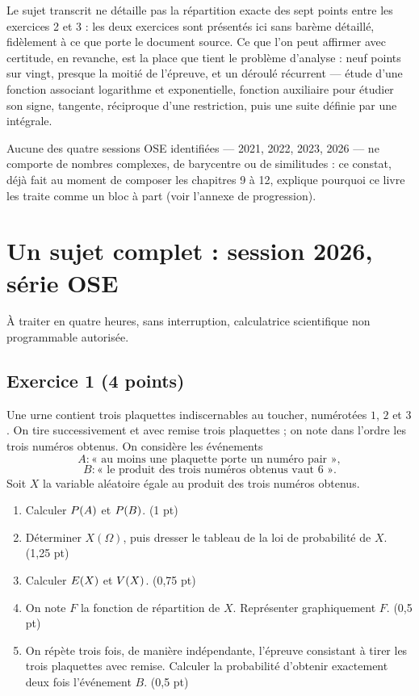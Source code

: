 \noindent
Le sujet transcrit ne détaille pas la répartition exacte des sept points
entre les exercices 2 et 3 : les deux exercices sont présentés ici sans
barème détaillé, fidèlement à ce que porte le document source. Ce que l'on
peut affirmer avec certitude, en revanche, est la place que tient le
problème d'analyse : neuf points sur vingt, presque la moitié de l'épreuve,
et un déroulé récurrent — étude d'une fonction associant logarithme et
exponentielle, fonction auxiliaire pour étudier son signe, tangente,
réciproque d'une restriction, puis une suite définie par une intégrale.

Aucune des quatre sessions OSE identifiées — 2021, 2022, 2023, 2026 — ne
comporte de nombres complexes, de barycentre ou de similitudes : ce constat,
déjà fait au moment de composer les chapitres 9 à 12, explique pourquoi ce
livre les traite comme un bloc à part (voir l'annexe de progression).

\section*{Un sujet complet : session 2026, série OSE}

À traiter en quatre heures, sans interruption, calculatrice scientifique non
programmable autorisée.

\subsection*{Exercice 1 \textnormal{(4 points)}}

Une urne contient trois plaquettes indiscernables au toucher, numérotées
$1$, $2$ et $3$. On tire successivement et avec remise trois plaquettes ; on
note dans l'ordre les trois numéros obtenus. On considère les événements
\[
  A : \text{« au moins une plaquette porte un numéro pair »},
\]
\[
  B : \text{« le produit des trois numéros obtenus vaut $6$ »} .
\]
Soit $X$ la variable aléatoire égale au produit des trois numéros obtenus.

\begin{enumerate}[label=\textbf{\arabic*.}, leftmargin=*, itemsep=0.25em]
  \item Calculer $P\!\left(A\right)$ et $P\!\left(B\right)$. \hfill\textup{(1 pt)}
  \item Déterminer $X(\Omega)$, puis dresser le tableau de la loi de
        probabilité de $X$. \hfill\textup{(1,25 pt)}
  \item Calculer $E(X)$ et $V(X)$. \hfill\textup{(0,75 pt)}
  \item On note $F$ la fonction de répartition de $X$. Représenter
        graphiquement $F$. \hfill\textup{(0,5 pt)}
  \item On répète trois fois, de manière indépendante, l'épreuve consistant à
        tirer les trois plaquettes avec remise. Calculer la probabilité
        d'obtenir exactement deux fois l'événement $B$. \hfill\textup{(0,5 pt)}
\end{enumerate}

